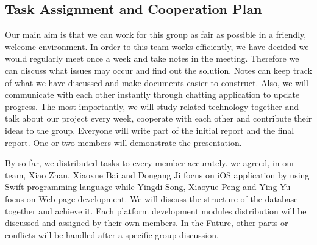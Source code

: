 \subsection{Task Assignment and Cooperation Plan}
\noindent Our main aim is that we can work for this group as fair as possible in a friendly, welcome environment. In order to this team works efficiently, we have decided we would regularly meet once a week and take notes in the meeting. Therefore we can discuss what issues may occur and find out the solution. Notes can keep track of what we have discussed and make documents easier to construct. Also, we will communicate with each other instantly through chatting application to update progress. The most importantly, we will study related technology together and talk about our project every week, cooperate with each other and contribute their ideas to the group. Everyone will write part of the initial report and the final report. One or two members will demonstrate the presentation.

 \vspace{0.3cm}
 
 
\noindent By so far, we distributed tasks to every member accurately. we agreed, in our team, Xiao Zhan, Xiaoxue Bai and Dongang Ji focus on iOS application by using Swift programming language while Yingdi Song, Xiaoyue Peng and Ying Yu focus on Web page development. We will discuss the structure of the database together and achieve it. Each platform development modules distribution will be discussed and assigned by their own members. In the Future, other parts or conflicts will be handled after a specific group discussion. 
